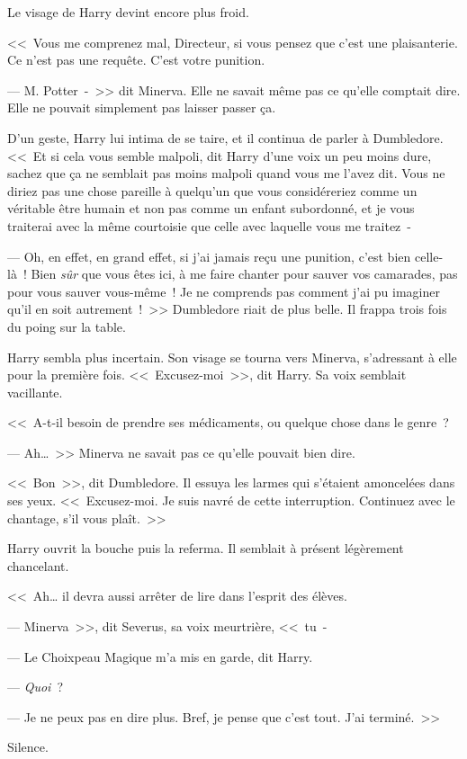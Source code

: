 Le visage de Harry devint encore plus froid.

<<~Vous me comprenez mal, Directeur, si vous pensez que c'est une plaisanterie. Ce n'est pas une requête. C'est votre punition.

--- M. Potter~-~>> dit Minerva. Elle ne savait même pas ce qu'elle comptait dire. Elle ne pouvait simplement pas laisser passer ça.

D'un geste, Harry lui intima de se taire, et il continua de parler à Dumbledore. <<~Et si cela vous semble malpoli, dit Harry d’une voix un peu moins dure, sachez que ça ne semblait pas moins malpoli quand vous me l'avez dit. Vous ne diriez pas une chose pareille à quelqu'un que vous considéreriez comme un véritable être humain et non pas comme un enfant subordonné, et je vous traiterai avec la même courtoisie que celle avec laquelle vous me traitez~-

--- Oh, en effet, en grand effet, si j'ai jamais reçu une punition, c'est bien celle-là~! Bien \emph{sûr} que vous êtes ici, à me faire chanter pour sauver vos camarades, pas pour vous sauver vous-même~! Je ne comprends pas comment j'ai pu imaginer qu'il en soit autrement~!~>> Dumbledore riait de plus belle. Il frappa trois fois du poing sur la table.

Harry sembla plus incertain. Son visage se tourna vers Minerva, s'adressant à elle pour la première fois. <<~Excusez-moi~>>, dit Harry. Sa voix semblait vacillante.

<<~A-t-il besoin de prendre ses médicaments, ou quelque chose dans le genre~?

--- Ah…~>> Minerva ne savait pas ce qu'elle pouvait bien dire.

<<~Bon~>>, dit Dumbledore. Il essuya les larmes qui s'étaient amoncelées dans ses yeux. <<~Excusez-moi. Je suis navré de cette interruption. Continuez avec le chantage, s'il vous plaît.~>>

Harry ouvrit la bouche puis la referma. Il semblait à présent légèrement chancelant.

<<~Ah… il devra aussi arrêter de lire dans l'esprit des élèves.

--- Minerva~>>, dit Severus, sa voix meurtrière, <<~tu~-

--- Le Choixpeau Magique m'a mis en garde, dit Harry.

--- \emph{Quoi}~?

--- Je ne peux pas en dire plus. Bref, je pense que c'est tout. J'ai terminé.~>>

Silence.


